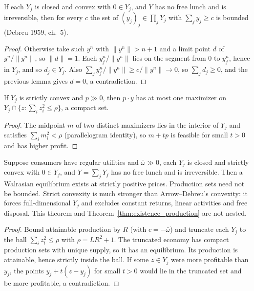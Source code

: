 \begin{lemma}
\label{lem:bound_attainable}
\leanok
{}
If each $Y_j$ is closed and convex with $0 \in Y_j$, and $Y$ has no free lunch and is irreversible, then for every $c$ the
set of $(y_j)_j \in \prod_j Y_j$ with $\sum_j y_j \ge c$ is bounded (Debreu 1959, ch.~5).
\end{lemma}
\begin{proof}
\leanok
Otherwise take such $y^n$ with $\|y^n\| > n+1$ and a limit point $d$ of $y^n/\|y^n\|$, so $\|d\| = 1$. Each
$y^n_j/\|y^n\|$ lies on the segment from $0$ to $y^n_j$, hence in $Y_j$, and so $d_j \in Y_j$. Also
$\sum_j y^n_j/\|y^n\| \ge c/\|y^n\| \to 0$, so $\sum_j d_j \ge 0$, and the previous lemma gives $d = 0$, a
contradiction.
\end{proof}

\begin{lemma}
\label{lem:profit_trunc_unique}
\leanok
If $Y_j$ is strictly convex and $p \gg 0$, then $p \cdot y$ has at most one maximizer on $Y_j \cap \{z : \sum_i z_i^2 \le
\rho\}$, a compact set.
\end{lemma}
\begin{proof}
\leanok
The midpoint $m$ of two distinct maximizers lies in the interior of $Y_j$ and satisfies $\sum_i m_i^2 < \rho$ (parallelogram
identity), so $m + tp$ is feasible for small $t > 0$ and has higher profit.
\end{proof}

\begin{theorem}
\label{thm:existence_unbounded}
\leanok
{}
Suppose consumers have regular utilities and $\bar\omega \gg 0$, each $Y_j$ is closed and strictly convex with $0 \in Y_j$,
and $Y = \sum_j Y_j$ has no free lunch and is irreversible. Then a Walrasian equilibrium exists at strictly positive
prices. Production sets need not be bounded. Strict convexity is much stronger than Arrow--Debreu's convexity: it forces
full-dimensional $Y_j$ and excludes constant returns, linear activities and free disposal. This theorem and
Theorem~\ref{thm:existence_production} are not nested.
\end{theorem}
\begin{proof}
\leanok
Bound attainable production by $R$ (with $c = -\bar\omega$) and truncate each $Y_j$ to the ball $\sum_i z_i^2 \le \rho$ with
$\rho = L R^2 + 1$. The truncated economy has compact production sets with unique supply, so it has an equilibrium. Its
production is attainable, hence strictly inside the ball. If some $z \in Y_j$ were more profitable than $y_j$, the points
$y_j + t(z - y_j)$ for small $t > 0$ would lie in the truncated set and be more profitable, a contradiction.
\end{proof}

